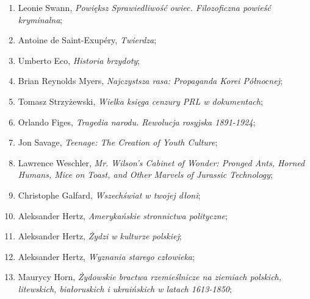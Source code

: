 \documentclass[a4paper,11pt]{article}
\begin{document}
\begin{enumerate}
\item Leonie Swann, \textit{Powiększ Sprawiedliwość owiec. Filozoficzna
    powieść kryminalna};



\item Antoine de Saint-Exupéry, \textit{Twierdza};



\item Umberto Eco, \textit{Historia brzydoty};



\item Brian Reynolds Myers, \textit{Najczystsza rasa: Propaganda Korei
    Północnej};



\item Tomasz Strzyżewski, \textit{Wielka księga cenzury PRL w
    dokumentach};



\item Orlando Figes, \textit{Tragedia narodu. Rewolucja rosyjska
    1891-1924};



\item Jon Savage, \textit{Teenage: The Creation of Youth Culture};



\item Lawrence Weschler, \textit{Mr. Wilson's Cabinet of Wonder: Pronged
    Ants, Horned Humans, Mice on Toast, and Other Marvels of Jurassic
    Technology};



\item Christophe Galfard, \textit{Wszechświat w twojej dłoni};



\item Aleksander Hertz, \textit{Amerykańskie stronnictwa polityczne};



\item Aleksander Hertz, \textit{Żydzi w kulturze polskiej};



\item Aleksander Hertz, \textit{Wyznania starego człowieka};



\item Maurycy Horn, \textit{Żydowskie bractwa rzemieślnicze na ziemiach
    polskich, litewskich, białoruskich i ukraińskich w latach
    1613-1850};




\end{enumerate}
\end{document}
